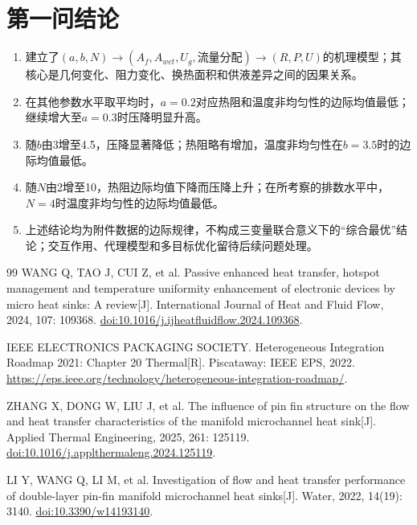 \documentclass[UTF8,12pt,a4paper]{ctexart}
\begin{document}
\section{第一问结论}
\begin{enumerate}
\item 建立了$(a,b,N)\to(A_f,A_{wet},U_g,\text{流量分配})\to(R,P,U)$的机理模型；其核心是几何变化、阻力变化、换热面积和供液差异之间的因果关系。
\item 在其他参数水平取平均时，$a=0.2$对应热阻和温度非均匀性的边际均值最低；继续增大至$a=0.3$时压降明显升高。
\item 随$b$由3增至4.5，压降显著降低；热阻略有增加，温度非均匀性在$b=3.5$时的边际均值最低。
\item 随$N$由2增至10，热阻边际均值下降而压降上升；在所考察的排数水平中，$N=4$时温度非均匀性的边际均值最低。
\item 上述结论均为附件数据的边际规律，不构成三变量联合意义下的“综合最优”结论；交互作用、代理模型和多目标优化留待后续问题处理。
\end{enumerate}

\begin{thebibliography}{99}
WANG Q, TAO J, CUI Z, et al. Passive enhanced heat transfer, hotspot management and temperature uniformity enhancement of electronic devices by micro heat sinks: A review[J]. International Journal of Heat and Fluid Flow, 2024, 107: 109368. \href{https://doi.org/10.1016/j.ijheatfluidflow.2024.109368}{doi:10.1016/j.ijheatfluidflow.2024.109368}.

IEEE ELECTRONICS PACKAGING SOCIETY. Heterogeneous Integration Roadmap 2021: Chapter 20 Thermal[R]. Piscataway: IEEE EPS, 2022. \url{https://eps.ieee.org/technology/heterogeneous-integration-roadmap/}.

ZHANG X, DONG W, LIU J, et al. The influence of pin fin structure on the flow and heat transfer characteristics of the manifold microchannel heat sink[J]. Applied Thermal Engineering, 2025, 261: 125119. \href{https://doi.org/10.1016/j.applthermaleng.2024.125119}{doi:10.1016/j.applthermaleng.2024.125119}.

LI Y, WANG Q, LI M, et al. Investigation of flow and heat transfer performance of double-layer pin-fin manifold microchannel heat sinks[J]. Water, 2022, 14(19): 3140. \href{https://doi.org/10.3390/w14193140}{doi:10.3390/w14193140}.
\end{thebibliography}
\end{document}
